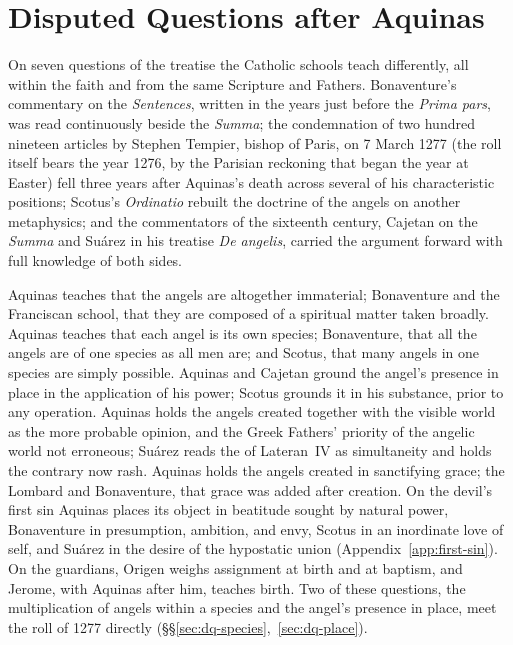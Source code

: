\section{Disputed Questions after Aquinas}\label{sec:disputed}

On seven questions of the treatise the Catholic schools teach
differently, all within the faith and from the same Scripture and
Fathers. Bonaventure's commentary on the \emph{Sentences}, written in the
years just before the \emph{Prima pars}, was read continuously beside the
\emph{Summa};
the condemnation of two hundred nineteen articles by Stephen Tempier,
bishop of Paris, on 7 March 1277 (the roll itself bears the year 1276, by
the Parisian reckoning that began the year at Easter) fell three years
after Aquinas's death across several of his characteristic positions;
Scotus's \emph{Ordinatio} rebuilt the doctrine of the angels on another
metaphysics; and the commentators of the sixteenth century, Cajetan on
the \emph{Summa} and Suárez in his treatise \emph{De angelis}, carried
the argument forward with full knowledge of both sides.

Aquinas teaches that the angels are altogether immaterial; Bonaventure
and the Franciscan school, that they are composed of a spiritual matter
taken broadly. Aquinas teaches that each angel is its own species;
Bonaventure, that all the angels are of one species as all men are; and
Scotus, that many angels in one species are simply possible. Aquinas and
Cajetan ground the angel's presence in place in the application of his
power; Scotus grounds it in his substance, prior to any operation.
Aquinas holds the angels created together with the visible world as the
more probable opinion, and the Greek Fathers' priority of the angelic
world not erroneous; Suárez reads the  of Lateran~IV as
simultaneity and holds the contrary now rash. Aquinas holds the angels
created in sanctifying grace; the Lombard and Bonaventure, that grace was
added after creation. On the devil's first sin Aquinas places its object
in beatitude sought by natural power, Bonaventure in presumption,
ambition, and envy, Scotus in an inordinate love of self, and Suárez in
the desire of the hypostatic union (Appendix~\ref{app:first-sin}). On the guardians, Origen weighs
assignment at birth and at baptism, and Jerome, with Aquinas after him,
teaches birth. Two of these questions, the multiplication of angels
within a species and the angel's presence in place, meet the roll of 1277
directly (\S\S\ref{sec:dq-species},~\ref{sec:dq-place}).

